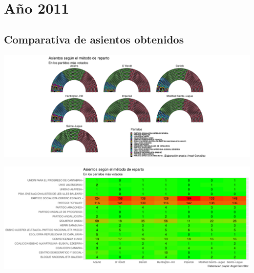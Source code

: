 \documentclass[12pt,a4paper,]{book}
\numberwithin{dummy}{section}
\theoremstyle{ocrenumbox}
\theoremstyle{blacknumex}
\theoremstyle{blacknumbox}
\theoremstyle{ocrenum}
\theoremstyle{ocrenum}
\begin{document}
\hypertarget{auxf1o-2011}{%
\section{Año 2011}\label{auxf1o-2011}}

\hypertarget{comparativa-de-asientos-obtenidos-10}{%
\subsection{Comparativa de asientos
obtenidos}\label{comparativa-de-asientos-obtenidos-10}}

\begin{center}\includegraphics[width=1\linewidth]{figurasR/unnamed-chunk-106-1} \end{center}

\begin{center}\includegraphics[width=1\linewidth]{figurasR/unnamed-chunk-106-2} \end{center}
\end{document}
